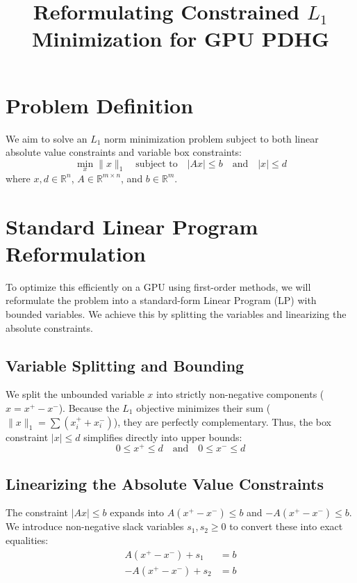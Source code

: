 \documentclass{article}
\title{Reformulating Constrained $L_1$ Minimization for GPU PDHG}
\author{}
\date{}
\begin{document}
\maketitle

\section{Problem Definition}
We aim to solve an $L_1$ norm minimization problem subject to both linear absolute value constraints and variable box constraints:
\begin{equation}
    \min_{x} \|x\|_1 \quad \text{subject to} \quad |Ax| \le b \quad \text{and} \quad |x| \le d
\end{equation}
where $x, d \in \mathbb{R}^n$, $A \in \mathbb{R}^{m \times n}$, and $b \in \mathbb{R}^m$.

\section{Standard Linear Program Reformulation}
To optimize this efficiently on a GPU using first-order methods, we will reformulate the problem into a standard-form Linear Program (LP) with bounded variables. We achieve this by splitting the variables and linearizing the absolute constraints.

\subsection{Variable Splitting and Bounding}
We split the unbounded variable $x$ into strictly non-negative components ($x = x^+ - x^-$). Because the $L_1$ objective minimizes their sum ($\|x\|_1 = \sum (x_i^+ + x_i^-)$), they are perfectly complementary. Thus, the box constraint $|x| \le d$ simplifies directly into upper bounds:
\begin{equation}
    0 \le x^+ \le d \quad \text{and} \quad 0 \le x^- \le d
\end{equation}

\subsection{Linearizing the Absolute Value Constraints}
The constraint $|Ax| \le b$ expands into $A(x^+ - x^-) \le b$ and $-A(x^+ - x^-) \le b$. We introduce non-negative slack variables $s_1, s_2 \ge 0$ to convert these into exact equalities:
\begin{align}
    A(x^+ - x^-) + s_1 &= b \\
    -A(x^+ - x^-) + s_2 &= b
\end{align}
\end{document}
